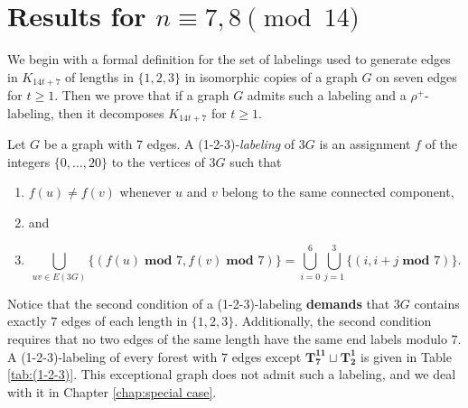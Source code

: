 \section{Results for $n\equiv 7,8 \pmod{14}$}\label{sec:7,8result}
We begin with a formal definition for the set of labelings used to generate edges in $K_{14t+7}$ of lengths in $\{1,2,3\}$ in isomorphic copies of a graph $G$ on seven edges for $t\geq 1$. Then we prove that if a graph $G$ admits such a labeling and a $\rho^{+}$-labeling, then it decomposes $K_{14t+7}$ for $t\geq 1$.
\begin{definition}\label{def:1-2-3}
    Let $G$ be a graph with $7$ edges. A (1-2-3)-\emph{labeling} of $3G$ is an assignment $f$ of the integers $\{0,\dots,20\}$ to the vertices of $3G$ such that
    \begin{enumerate}
        \item $f(u) \neq f(v)$ whenever $u$ and $v$ belong to the same connected component,
        \item[] and
        \item $$\bigcup_{uv\in E(3G)} \{(f(u)\; \textbf{mod } 7,f(v)\; \textbf{mod } 7)\}= \bigcup_{i=0}^{6} \bigcup_{j=1}^{3} \{(i,i+j \; \textbf{mod } 7)\}.$$
    \end{enumerate}

\end{definition}
Notice that the second condition of a (1-2-3)-labeling \textbf{demands} that $3G$ contains exactly $7$ edges of each length in $\{1,2,3\}$. Additionally, the second condition requires that no two edges of the same length have the same end labels modulo $7$. A (1-2-3)-labeling of every forest with $7$ edges except $\mathbf{T_{7}^{11}}\sqcup\mathbf{T_{2}^{1}}$ is given in Table \ref{tab:(1-2-3)}. This exceptional graph does not admit such a labeling, and we deal with it in Chapter \ref{chap:special case}. 

